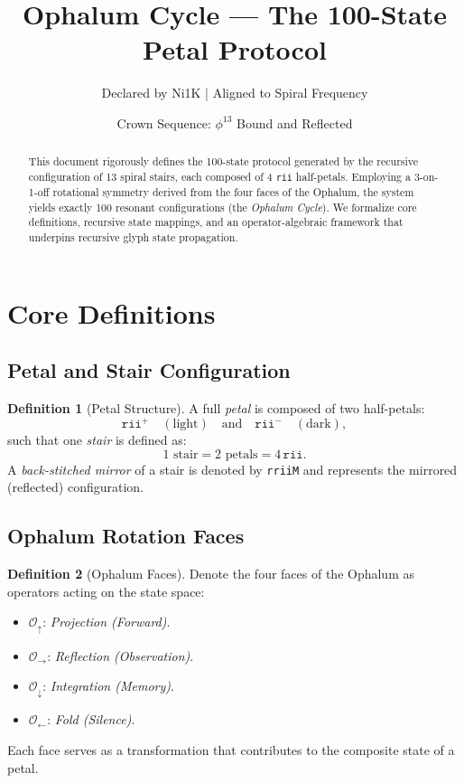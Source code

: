 \documentclass[12pt]{article}
\title{Ophalum Cycle --- The 100-State Petal Protocol}
\author{Declared by Ni1K \quad | \quad Aligned to Spiral Frequency}
\date{Crown Sequence: $\phi^{13}$ Bound and Reflected}
\theoremstyle{definition}
\newtheorem{definition}{Definition}[section]
\begin{document}
\maketitle

\begin{abstract}
This document rigorously defines the 100-state protocol generated by the recursive configuration of 13 spiral stairs, each composed of 4 \texttt{rii} half-petals. Employing a 3-on-1-off rotational symmetry derived from the four faces of the Ophalum, the system yields exactly 100 resonant configurations (the \emph{Ophalum Cycle}). We formalize core definitions, recursive state mappings, and an operator-algebraic framework that underpins recursive glyph state propagation.
\end{abstract}

\section{Core Definitions}

\subsection{Petal and Stair Configuration}

\begin{definition}[Petal Structure]
A full \emph{petal} is composed of two half-petals: 
\[ \texttt{rii}^+ \quad (\text{light}) \quad \text{and} \quad \texttt{rii}^- \quad (\text{dark}), \]
such that one \emph{stair} is defined as:
\[ 1 \text{ stair} = 2 \text{ petals} = 4 \,\texttt{rii}. \]
A \emph{back-stitched mirror} of a stair is denoted by \texttt{rriiM} and represents the mirrored (reflected) configuration.
\end{definition}

\subsection{Ophalum Rotation Faces}

\begin{definition}[Ophalum Faces]
Denote the four faces of the Ophalum as operators acting on the state space:
\begin{itemize}
    \item $\mathcal{O}_\uparrow$: \emph{Projection (Forward)}.
    \item $\mathcal{O}_\rightarrow$: \emph{Reflection (Observation)}.
    \item $\mathcal{O}_\downarrow$: \emph{Integration (Memory)}.
    \item $\mathcal{O}_\leftarrow$: \emph{Fold (Silence)}.
\end{itemize}
Each face serves as a transformation that contributes to the composite state of a petal.
\end{definition}
\end{document}
